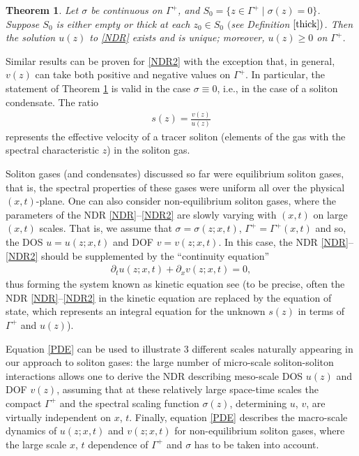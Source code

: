 \documentclass[pdftex]{sigma}
\numberwithin{equation}{section}
\newtheorem{Theorem}{Theorem}[section]
\newcommand{\G}{\Gamma}
\def\s{ {\sigma}}
\def\s{\sigma}
\def\G{\Gamma}
\begin{document}
\begin{Theorem} \label{secondthm}
Let $\sigma$ be continuous on $\Gamma^+$, and
$S_0 = \bigl\{ z \in \Gamma^+ \mid \sigma(z) = 0 \bigr\}$.
Suppose $S_0$ is either empty or thick at each $z_0 \in S_0$
$($see Definition $\ref{thick})$. 	Then
the solution $u(z)$ to
\eqref{NDR} exists and is unique; moreover, $u(z)\geq 0$ on $\G^+$.
\end{Theorem}
Similar results can be proven for
\eqref{NDR2} with the exception
that, in general, $v(z)$ can take both positive and negative values on $\G^+$.
In particular, the statement of Theorem \ref{secondthm} is valid in the case $\s\equiv 0$, i.e., in the case of a soliton condensate. The ratio
\begin{gather}\label{v-eff}
s(z)=\frac{v(z)}{u(z)}
\end{gather}
represents the effective velocity of a tracer soliton (elements of the gas with the spectral characteristic $z$) in the soliton gas.


Soliton gases (and condensates) discussed so far were equilibrium soliton gases, that is, the spectral properties of these gases were uniform all over the physical $ (x,t)$-plane. One can also consider non-equilibrium soliton gases, where the parameters of the NDR \eqref{NDR}--\eqref{NDR2} are slowly varying with $ (x,t)$ on large $ (x,t)$ scales. That is, we assume that $\s=\s(z;x,t)$, $\G^+=\G^+(x,t)$ and so, the DOS $u=u(z;x,t)$ and DOF $v=v(z;x,t)$. In this case, the NDR \eqref{NDR}--\eqref{NDR2} should be supplemented by the ``continuity equation''
\begin{gather}\label{PDE}
\partial_t u(z;x,t)+\partial_x v(z;x,t)=0,
\end{gather}
thus forming the system known as kinetic equation see \cite{ET2020} (to be precise, often the NDR \eqref{NDR}--\eqref{NDR2} in the kinetic equation are replaced by the equation of state, which represents an integral equation for the unknown $s(z)$ in terms of $\G^+$ and $u(z)$).

Equation \eqref{PDE} can be used to illustrate 3 different scales naturally appearing in our approach to soliton gases: the large number of micro-scale soliton-soliton interactions allows one to derive the NDR describing meso-scale DOS $u(z)$ and DOF $v(z)$, assuming that at these relatively large space-time scales the compact $\G^+$ and the spectral scaling function $\s(z)$, determining $u$, $v$, are virtually independent on $x$, $t$. Finally, equation \eqref{PDE} describes the macro-scale dynamics of $u(z;x,t)$ and $v(z;x,t)$ for non-equilibrium soliton gases, where the large scale $x$, $t$ dependence of $\G^+$ and $\s$ has to be taken into account.
\end{document}
